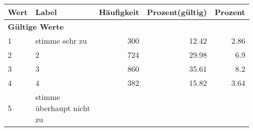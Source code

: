      \begin{longtable}{lXrrr}
     \toprule
     \textbf{Wert} & \textbf{Label} & \textbf{Häufigkeit} & \textbf{Prozent(gültig)} & \textbf{Prozent} \\
     \endhead
     \midrule
     \multicolumn{5}{l}{\textbf{Gültige Werte}}\\

     1 &
     \multicolumn{1}{X}{ stimme sehr zu   } &


       \num{300} &
       \num[round-mode=places,round-precision=2]{12.42} &
         \num[round-mode=places,round-precision=2]{2.86} \\

     2 &
     \multicolumn{1}{X}{ 2   } &


       \num{724} &
       \num[round-mode=places,round-precision=2]{29.98} &
         \num[round-mode=places,round-precision=2]{6.9} \\

     3 &
     \multicolumn{1}{X}{ 3   } &


       \num{860} &
       \num[round-mode=places,round-precision=2]{35.61} &
         \num[round-mode=places,round-precision=2]{8.2} \\

     4 &
     \multicolumn{1}{X}{ 4   } &


       \num{382} &
       \num[round-mode=places,round-precision=2]{15.82} &
         \num[round-mode=places,round-precision=2]{3.64} \\

     5 &
     \multicolumn{1}{X}{ stimme überhaupt nicht zu   } &



\end{longtable}
